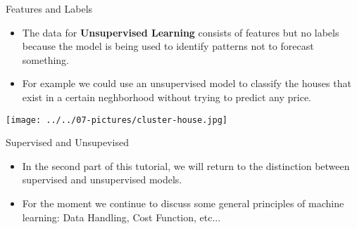 \documentclass[11pt]{beamer}
\begin{document}
\begin{frame}{Features and Labels}
	\begin{itemize}
		\item The data for \textbf{Unsupervised Learning} consists of features but no labels because the model is being used to identify patterns not to forecast something. 
		\item For example we could use an unsupervised model to classify the houses that exist in a certain neghborhood without trying to predict any price.
	\end{itemize}
\begin{center}
\texttt{[image: ../../07-pictures/cluster-house.jpg]} 
\end{center}	
\end{frame}
\begin{frame}{Supervised and Unsupevised}
	\begin{itemize}
		\item In the second part of this tutorial, we will return to the distinction between supervised and unsupervised models. 
		\item For the moment we continue to discuss some general principles of machine learning: Data Handling, Cost Function, etc...
	\end{itemize}
\end{frame}
%
\end{document}

